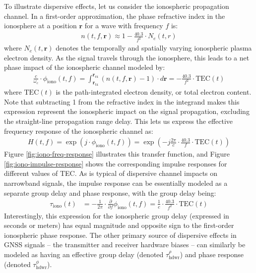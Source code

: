 \documentclass{article}
\begin{document}
To illustrate dispersive effects, let us consider the ionospheric propagation channel.  In a first-order approximation, the phase refractive index in the ionosphere at a position $\mathbf{r}$ for a wave with frequency $f$ is:
%
\begin{align}
    n(t,f,\mathbf{r}) \approx 1 - \frac{40.3}{f^2} \cdot N_e(t,r)
\end{align}
%
where $N_e(t,\mathbf{r})$ denotes the temporally and spatially varying ionospheric plasma electron density.  As the signal travels through the ionosphere, this leads to a net phase impact of the ionospheric channel modeled by:
%
\begin{align}
    \frac{c}{\omega_c} \cdot \phi_\text{iono}(t,f) = \int_{\mathbf{r}_\text{tx}}^{\mathbf{r}_\text{rx}} \left( n(t,f,\mathbf{r}) - 1 \right) \cdot d\mathbf{r} = - \frac{40.3}{f^2} \cdot \text{TEC}(t)
\end{align}
%
where $\text{TEC}(t)$ is the path-integrated electron density, or  total electron content.  Note that subtracting 1 from the refractive index in the integrand makes this expression represent the ionospheric impact on the signal propagation, excluding the straight-line prropagation range delay.  This lets us express the effective frequency response of the ionospheric channel as:
%
\begin{align}
    H(t,f) = \exp\left(j \cdot \phi_\text{iono}(t,f)\right) =  \exp \left( -j \frac{2\pi}{c} \cdot \frac{40.3}{f} \cdot \text{TEC}(t) \right)
\end{align}
%
Figure \ref{fig:iono-freq-response} illustrates this transfer function, and Figure \ref{fig:iono-impulse-response} shows the corresponding impulse responses for different values of TEC.  As is typical of dispersive channel impacts on narrowband signals, the impulse response can be essentially modeled as a separate group delay and phase response, with the group delay being:
%
\begin{align}
    \tau_\text{iono}(t) &= -\frac{1}{2\pi}\cdot \frac{\partial}{\partial f} \phi_\text{iono}(t,f) = \frac{1}{c} \cdot \frac{40.3}{f^2} \cdot \text{TEC}(t)
\end{align}
%
Interestingly, this expression for the ionospheric group delay (expressed in seconds or meters) has equal magnitude and opposite sign to the first-order ionospheric phase response.  The other primary source of dispersive effects in GNSS signals -- the transmitter and receiver hardware biases -- can similarly be modeled as having an effective group delay (denoted $\tau^\rho_\text{hdwr}$) and phase response (denoted $\tau^\phi_\text{hdwr}$).
\end{document}
